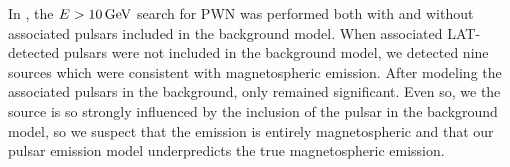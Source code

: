 In \citep{acero_2013a_constraints-galactic}, the
$E>10\,\text{GeV}$ search for \ac{PWN} was performed both with
and without associated pulsars included in the background model.  When
associated \ac{LAT}-detected pulsars were not included in the background
model, we detected nine sources which were consistent with magnetospheric
emission.  After modeling the associated pulsars in the background, only
 remained significant.  Even so, we the source is so strongly
influenced by the inclusion of the pulsar in the background model, so
we suspect that the emission is entirely magnetospheric and that our
pulsar emission model underpredicts the true magnetospheric emission.
